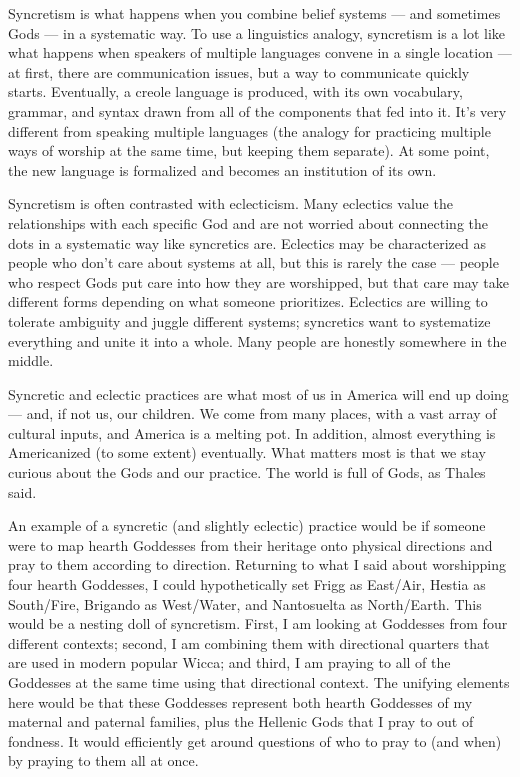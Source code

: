\documentclass[
]{book}
\begin{document}
Syncretism is what happens when you combine belief systems --- and sometimes Gods --- in a systematic way. To use a linguistics analogy, syncretism is a lot like what happens when speakers of multiple languages convene in a single location --- at first, there are communication issues, but a way to communicate quickly starts. Eventually, a creole language is produced, with its own vocabulary, grammar, and syntax drawn from all of the components that fed into it. It's very different from speaking multiple languages (the analogy for practicing multiple ways of worship at the same time, but keeping them separate). At some point, the new language is formalized and becomes an institution of its own.

Syncretism is often contrasted with eclecticism. Many eclectics value the relationships with each specific God and are not worried about connecting the dots in a systematic way like syncretics are. Eclectics may be characterized as people who don't care about systems at all, but this is rarely the case --- people who respect Gods put care into how they are worshipped, but that care may take different forms depending on what someone prioritizes. Eclectics are willing to tolerate ambiguity and juggle different systems; syncretics want to systematize everything and unite it into a whole. Many people are honestly somewhere in the middle.

Syncretic and eclectic practices are what most of us in America will end up doing --- and, if not us, our children. We come from many places, with a vast array of cultural inputs, and America is a melting pot. In addition, almost everything is Americanized (to some extent) eventually. What matters most is that we stay curious about the Gods and our practice. The world is full of Gods, as Thales said.

An example of a syncretic (and slightly eclectic) practice would be if someone were to map hearth Goddesses from their heritage onto physical directions and pray to them according to direction. Returning to what I said about worshipping four hearth Goddesses, I could hypothetically set Frigg as East/Air, Hestia as South/Fire, Brigando as West/Water, and Nantosuelta as North/Earth. This would be a nesting doll of syncretism. First, I am looking at Goddesses from four different contexts; second, I am combining them with directional quarters that are used in modern popular Wicca; and third, I am praying to all of the Goddesses at the same time using that directional context. The unifying elements here would be that these Goddesses represent both hearth Goddesses of my maternal and paternal families, plus the Hellenic Gods that I pray to out of fondness. It would efficiently get around questions of who to pray to (and when) by praying to them all at once.
\end{document}
